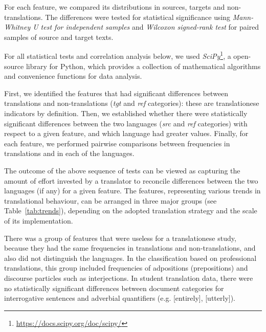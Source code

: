 For each feature, we compared its distributions in sources, targets and non-translations. The differences were tested for statistical significance using \textit{Mann-Whitney U test for independent samples} and \textit{Wilcoxon signed-rank test} for paired samples of source and target texts. 

For all statistical tests and correlation analysis below, we used \textit{SciPy}\footnote{\url{https://docs.scipy.org/doc/scipy/}}, a open-source library for Python, which provides a collection of mathematical algorithms and convenience functions for data analysis.

First, we identified the features that had significant differences between translations and non-translations (\textit{tgt} and \textit{ref} categories): these are translationese indicators by definition. 
Then, we established whether there were statistically significant differences between the two languages (\textit{src} and \textit{ref} categories) with respect to a given feature, and which language had greater values.
Finally, for each feature, we performed pairwise comparisons between frequencies in translations and in each of the languages.

The outcome of the above sequence of tests can be viewed as capturing the amount of effort invested by a translator to reconcile differences between the two languages (if any) for a given feature. The features, representing various trends in translational behaviour, can be arranged in three major groups (see Table~\ref{tab:trends}), depending on the adopted translation strategy and the scale of its implementation. 

There was a group of features that were useless for a translationese study, because they had the same frequencies in translations and non-translations, and also did not distinguish the languages. In the classification based on professional translations, this group included frequencies of adpositions (prepositions) and discourse particles such as interjections. In student translation data, there were no statistically significant differences between document categories for interrogative sentences and adverbial quantifiers (e.g.  [entirely],   [utterly]).

\newpage

